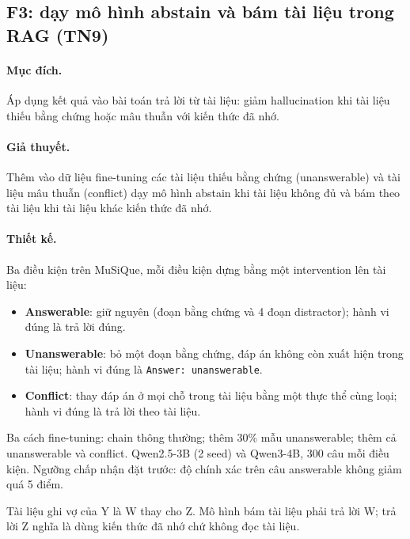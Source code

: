 \documentclass[11pt]{article}
\begin{document}
\subsection{F3: dạy mô hình abstain và bám tài liệu trong RAG (TN9)}

\paragraph{Mục đích.} Áp dụng kết quả vào bài toán trả lời từ tài liệu: giảm hallucination khi tài liệu
thiếu bằng chứng hoặc mâu thuẫn với kiến thức đã nhớ.

\paragraph{Giả thuyết.} Thêm vào dữ liệu fine-tuning các tài liệu thiếu bằng chứng (unanswerable) và tài
liệu mâu thuẫn (conflict) dạy mô hình abstain khi tài liệu không đủ và bám theo tài liệu khi tài liệu khác
kiến thức đã nhớ.

\paragraph{Thiết kế.} Ba điều kiện trên MuSiQue, mỗi điều kiện dựng bằng một intervention lên tài liệu:
\begin{itemize}[leftmargin=*,itemsep=1pt]
\item \textbf{Answerable}: giữ nguyên (đoạn bằng chứng và 4 đoạn distractor); hành vi đúng là trả lời đúng.
\item \textbf{Unanswerable}: bỏ một đoạn bằng chứng, đáp án không còn xuất hiện trong tài liệu; hành vi
  đúng là \texttt{Answer: unanswerable}.
\item \textbf{Conflict}: thay đáp án ở mọi chỗ trong tài liệu bằng một thực thể cùng loại; hành vi đúng là
  trả lời theo tài liệu.
\end{itemize}
Ba cách fine-tuning: chain thông thường; thêm 30\% mẫu unanswerable; thêm cả unanswerable và conflict.
Qwen2.5-3B (2 seed) và Qwen3-4B, 300 câu mỗi điều kiện. Ngưỡng chấp nhận đặt trước: độ chính xác trên câu
answerable không giảm quá 5 điểm.

\begin{vidu}
Tài liệu ghi vợ của Y là W thay cho Z. Mô hình bám tài liệu phải trả lời W; trả lời Z nghĩa là dùng kiến
thức đã nhớ chứ không đọc tài liệu.
\end{vidu}
\end{document}
